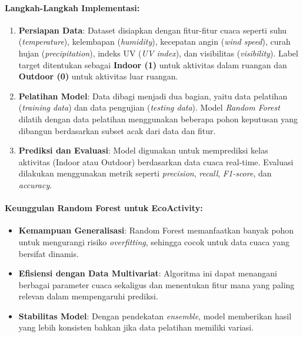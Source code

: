 \documentclass[journal,article,submit,pdftex,moreauthors]{Definitions/mdpi}
\begin{document}
\paragraph{Langkah-Langkah Implementasi:}
\begin{enumerate}
    \item \textbf{Persiapan Data}: 
    Dataset disiapkan dengan fitur-fitur cuaca seperti suhu (\textit{temperature}), kelembapan (\textit{humidity}), kecepatan angin (\textit{wind speed}), curah hujan (\textit{precipitation}), indeks UV (\textit{UV index}), dan visibilitas (\textit{visibility}). Label target ditentukan sebagai \textbf{Indoor (1)} untuk aktivitas dalam ruangan dan \textbf{Outdoor (0)} untuk aktivitas luar ruangan.
    
    \item \textbf{Pelatihan Model}:
    Data dibagi menjadi dua bagian, yaitu data pelatihan (\textit{training data}) dan data pengujian (\textit{testing data}). Model \textit{Random Forest} dilatih dengan data pelatihan menggunakan beberapa pohon keputusan yang dibangun berdasarkan subset acak dari data dan fitur.
    
    \item \textbf{Prediksi dan Evaluasi}:
    Model digunakan untuk memprediksi kelas aktivitas (Indoor atau Outdoor) berdasarkan data cuaca real-time. Evaluasi dilakukan menggunakan metrik seperti \textit{precision}, \textit{recall}, \textit{F1-score}, dan \textit{accuracy}.
\end{enumerate}

\paragraph{Keunggulan Random Forest untuk EcoActivity:}
\begin{itemize}
    \item \textbf{Kemampuan Generalisasi}: 
    Random Forest memanfaatkan banyak pohon untuk mengurangi risiko \textit{overfitting}, sehingga cocok untuk data cuaca yang bersifat dinamis.
    
    \item \textbf{Efisiensi dengan Data Multivariat}: 
    Algoritma ini dapat menangani berbagai parameter cuaca sekaligus dan menentukan fitur mana yang paling relevan dalam mempengaruhi prediksi.
    
    \item \textbf{Stabilitas Model}: 
    Dengan pendekatan \textit{ensemble}, model memberikan hasil yang lebih konsisten bahkan jika data pelatihan memiliki variasi.
\end{itemize}
\end{document}
